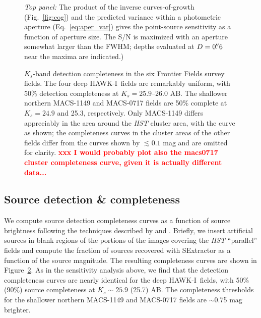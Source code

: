 \documentclass[preprint2]{aastex6}
\gdef\HAWKI{\mbox{HAWK-I}}
\begin{document}
\begin{figure}[!t]
\caption{\textit{Top panel:} The product of the inverse curves-of-growth (Fig.~\ref{fig:cog}) and the predicted variance within a photometric aperture (Eq.~\ref{eq:aper_var}) gives the point-source sensitivity as a function of aperture size.  The S/N is maximized with an aperture somewhat larger than the FWHM; depths evaluated at $D=0\mbox{$.\!\!^{\prime\prime}$}6$ near the maxima are indicated.)
\label{fig:depth}}  
\end{figure}

\begin{figure}[!t]
\caption{$K_s$-band detection completeness in the six Frontier Fields survey fields. The four deep \HAWKI\ fields are remarkably uniform, with 50\% detection completeness at $K_s=25.9$--26.0 AB.  The shallower northern MACS-1149 and MACS-0717 fields are 50\% complete at $K_s=24.9$ and 25.3, respectively.  Only MACS-1149 differs appreciably in the area around the \textit{HST} cluster area, with the curve as shown;  the completeness curves in the cluster areas of the other fields differ from the curves shown by $\lesssim0.1$ mag and are omitted for clarity. \textcolor{red}{\bf xxx I would probably plot also the macs0717 cluster completeness curve, given it is actually different data... }
\label{fig:completeness}}  
\end{figure}

\subsection{Source detection \& completeness}
\label{s:completeness}


We compute source detection completeness curves as a function of source brightness following the techniques described by \cite{whitaker:nmbs} and \cite{muzzin:13}.  Briefly, we insert artificial sources in blank regions of the portions of the images covering the \textit{HST} ``parallel'' fields and compute the fraction of sources recovered with SExtractor as a function of the source magnitude.  The resulting completeness curves are shown in Figure~\ref{fig:completeness}.   As in the sensitivity analysis above, we find that the detection completeness curves are nearly identical for the deep \HAWKI\ fields, with 50\% (90\%) source completeness at $K_s\sim25.9$ (25.7) AB.  The completeness thresholds for the shallower northern MACS-1149 and MACS-0717 fields are $\sim$0.75 mag brighter.
\end{document}
